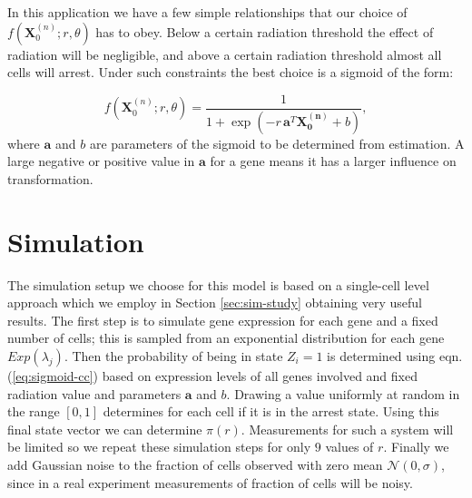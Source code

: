 In this application we have a few simple relationships that our choice of $f(\mathbf{X}_0^{(n)}; r, \theta)$ has to obey. Below a certain radiation threshold the effect of radiation will be negligible, and above a certain radiation threshold almost all cells will arrest. Under such constraints the best choice is a sigmoid of the form:

\begin{equation}
  \label{eq:sigmoid-cc}
  f(\mathbf{X}_0^{(n)}; r, \theta) = \frac{1}{1 + \exp ( -r\, \mathbf{a}^T \mathbf{X_0^{(n)}} + b)},
\end{equation}
where $\mathbf{a}$ and $b$ are parameters of the sigmoid to be determined from estimation. A large negative or positive value in $\mathbf{a}$ for a gene means it has a larger influence on transformation.

\section{Simulation}
\label{sec:simulation}

The simulation setup we choose for this model is based on a single-cell level approach which we employ in Section \ref{sec:sim-study} obtaining very useful results. The first step is to simulate gene expression for each gene and a fixed number of cells; this is sampled from an exponential distribution for each gene $Exp(\lambda_j)$. Then the probability of being in state $Z_i = 1$  is determined using eqn. (\ref{eq:sigmoid-cc}) based on expression levels of all genes involved and fixed radiation value and parameters  $\mathbf{a}$ and $b$. Drawing a value uniformly at random in the range $[0, 1]$ determines for each cell if it is in the arrest state. Using this final state vector we can determine $\pi(r)$. Measurements for such a system will be limited so we repeat these simulation steps for only $9$ values of $r$. Finally we add Gaussian noise to the fraction of cells observed with zero mean $\mathcal{N}(0, \sigma)$, since in a real experiment measurements of fraction of cells will be noisy. 

